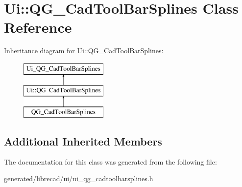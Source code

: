 \hypertarget{classUi_1_1QG__CadToolBarSplines}{\section{Ui\-:\-:Q\-G\-\_\-\-Cad\-Tool\-Bar\-Splines Class Reference}
\label{classUi_1_1QG__CadToolBarSplines}
}
Inheritance diagram for Ui\-:\-:Q\-G\-\_\-\-Cad\-Tool\-Bar\-Splines\-:\begin{figure}[H]
\begin{center}
\leavevmode
\includegraphics[height=3.000000cm]{classUi_1_1QG__CadToolBarSplines}
\end{center}
\end{figure}
\subsection*{Additional Inherited Members}


The documentation for this class was generated from the following file\-:\begin{DoxyCompactItemize}
\item 
generated/librecad/ui/ui\-\_\-qg\-\_\-cadtoolbarsplines.\-h\end{DoxyCompactItemize}
